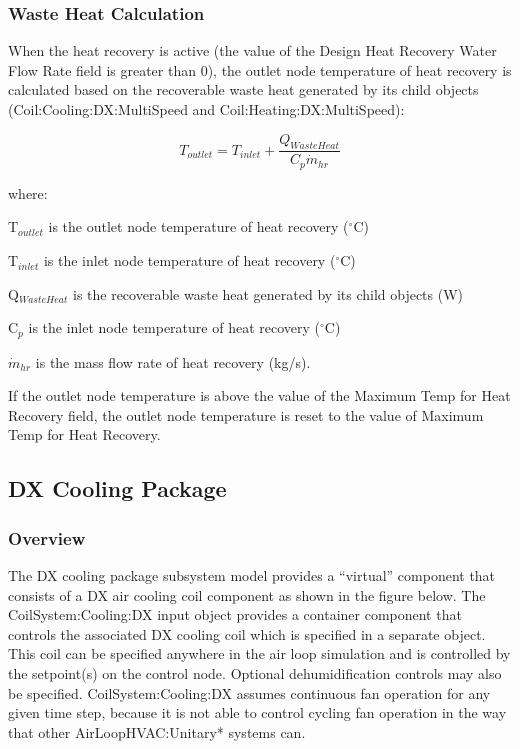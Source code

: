 \subsubsection{Waste Heat Calculation}\label{waste-heat-calculation-1}

When the heat recovery is active (the value of the Design Heat Recovery Water Flow Rate field is greater than 0), the outlet node temperature of heat recovery is calculated based on the recoverable waste heat generated by its child objects (Coil:Cooling:DX:MultiSpeed and Coil:Heating:DX:MultiSpeed):

\begin{equation}
{T_{outlet}} = {T_{inlet}} + \frac{{{Q_{WasteHeat}}}}{{{C_p}{{\dot m}_{hr}}}}
\end{equation}

where:

T\(_{outlet}\) is the outlet node temperature of heat recovery (\(^{\circ}\)C)

T\(_{inlet}\) is the inlet node temperature of heat recovery (\(^{\circ}\)C)

Q\(_{WasteHeat}\) is the recoverable waste heat generated by its child objects (W)

C\(_{p}\) is the inlet node temperature of heat recovery (\(^{\circ}\)C)

\({{{\dot m}_{hr}}}\) is the mass flow rate of heat recovery (kg/s).

If the outlet node temperature is above the value of the Maximum Temp for Heat Recovery field, the outlet node temperature is reset to the value of Maximum Temp for Heat Recovery.

\subsection{DX Cooling Package}\label{dx-cooling-package}

\subsubsection{Overview}\label{overview-5}

The DX cooling package subsystem model provides a ``virtual'' component that consists of a DX air cooling coil component as shown in the figure below. The CoilSystem:Cooling:DX input object provides a container component that controls the associated DX cooling coil which is specified in a separate object. This coil can be specified anywhere in the air loop simulation and is controlled by the setpoint(s) on the control node. Optional dehumidification controls may also be specified. CoilSystem:Cooling:DX assumes continuous fan operation for any given time step, because it is not able to control cycling fan operation in the way that other AirLoopHVAC:Unitary* systems can.

